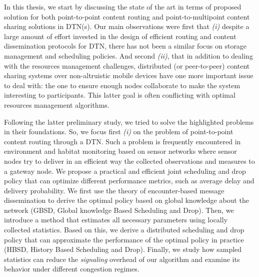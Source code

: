 \documentclass[a4paper,11pt,twoside]{ThesisStyle}
\begin{document}
In this thesis, we start by discussing the state of the art in terms of proposed solution for both point-to-point content routing and point-to-multipoint content sharing solutions in DTN(s). Our main observations were first that \emph{(i)} despite a large amount of effort invested in the design of efficient routing and content dissemination protocols for DTN, there has not been a similar focus on storage management and scheduling policies. And second \emph{(ii)}, that in addition to dealing with the resources management challenges, distributed (or peer-to-peer) content sharing systems over non-altruistic mobile devices have one more important issue to deal with: the one to ensure enough nodes collaborate to make the system interesting to participants. This latter goal is often conflicting with optimal resources management algorithms. 

Following the latter preliminary study, we tried to solve the highlighted problems in their foundations. So, we focus first \emph{(i)} on the problem of point-to-point content routing through a DTN. Such a problem is frequently encountered in environment and habitat monitoring based on sensor networks where sensor nodes try to deliver in an efficient way the collected observations and measures to a gateway node. We propose a practical and efficient joint scheduling and drop policy that can optimize different performance metrics, such as average delay and delivery probability. We first use the theory of encounter-based message dissemination to derive the optimal policy based on global knowledge about the network (GBSD, Global knowledge Based Scheduling and Drop). Then, we introduce a method that estimates all necessary parameters using locally collected statistics. Based on this, we derive a distributed scheduling and drop policy that can approximate the performance of the optimal policy in practice (HBSD, History Based Scheduling and Drop). Finally, we study how sampled statistics can reduce the \textit{signaling} overhead of our algorithm and examine its behavior under different congestion regimes. 
\end{document}
